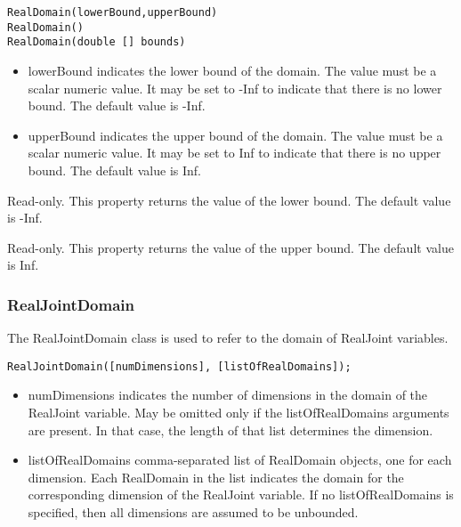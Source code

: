 \fi

\ifjava
\begin{lstlisting}
RealDomain(lowerBound,upperBound)
RealDomain()
RealDomain(double [] bounds)
\end{lstlisting}

\begin{itemize}
\item lowerBound indicates the lower bound of the domain.  The value must be a scalar numeric value.  It may be set to -Inf to indicate that there is no lower bound.  The default value is -Inf.
\item upperBound indicates the upper bound of the domain.  The value must be a scalar numeric value.  It may be set to Inf to indicate that there is no upper bound.  The default value is Inf.
\end{itemize}

\fi


\ifmatlab
{}
\fi
\ifjava
{}
\fi

Read-only.  This property returns the value of the lower bound.  The default value is -Inf.

\ifmatlab
{}
\fi
\ifjava
{}
\fi

Read-only.  This property returns the value of the upper bound.  The default value is Inf.



\subsubsection{RealJointDomain}
\label{sec:RealJointDomain}

The RealJointDomain class is used to refer to the domain of RealJoint variables.


\ifmatlab
\begin{lstlisting}
RealJointDomain([numDimensions], [listOfRealDomains]);
\end{lstlisting}

\begin{itemize}
\item numDimensions indicates the number of dimensions in the domain of the RealJoint variable.  May be omitted only if the listOfRealDomains arguments are present.  In that case, the length of that list determines the dimension.
\item listOfRealDomains comma-separated list of RealDomain objects, one for each dimension.  Each RealDomain in the list indicates the domain for the corresponding dimension of the RealJoint variable.  If no listOfRealDomains is specified, then all dimensions are assumed to be unbounded.
\end{itemize}
\fi


